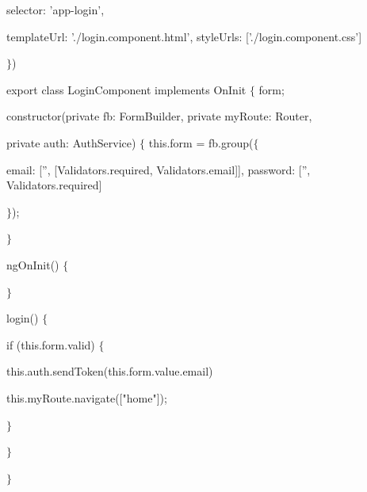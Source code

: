 \documentclass{article}
\begin{document}
\noindent selector: 'app-login',

\noindent templateUrl: './login.component.html', styleUrls: ['./login.component.css']

\noindent $\mathrm{\}}$)

\noindent export class LoginComponent implements OnInit $\mathrm{\{}$ form;

\noindent constructor(private fb: FormBuilder, private myRoute: Router,

\noindent private auth: AuthService) $\mathrm{\{}$ this.form = fb.group($\mathrm{\{}$

\noindent email: ['', [Validators.required, Validators.email]], password: ['', Validators.required]

\noindent $\mathrm{\}}$);

\noindent $\mathrm{\}}$

\noindent ngOnInit() $\mathrm{\{}$

\noindent $\mathrm{\}}$

\noindent login() $\mathrm{\{}$

\noindent if (this.form.valid) $\mathrm{\{}$ 

\noindent this.auth.sendToken(this.form.value.email) 

\noindent this.myRoute.navigate(["home"]);

\noindent $\mathrm{\}}$

\noindent $\mathrm{\}}$

\noindent $\mathrm{\}}$

 

 

 

\noindent 
\end{document}
